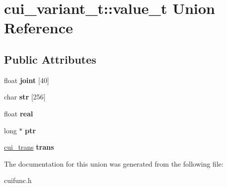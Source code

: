 \hypertarget{unioncui__variant__t_1_1value__t}{\section{cui\-\_\-variant\-\_\-t\-:\-:value\-\_\-t Union Reference}
\label{unioncui__variant__t_1_1value__t}
}
\subsection*{Public Attributes}
\begin{DoxyCompactItemize}
\item 
\hypertarget{unioncui__variant__t_1_1value__t_afac86c005325dd05c5dc98daf880e931}{float {\bfseries joint} \mbox{[}40\mbox{]}}\label{unioncui__variant__t_1_1value__t_afac86c005325dd05c5dc98daf880e931}

\item 
\hypertarget{unioncui__variant__t_1_1value__t_af57800df34d46ee9447b465b2d713198}{char {\bfseries str} \mbox{[}256\mbox{]}}\label{unioncui__variant__t_1_1value__t_af57800df34d46ee9447b465b2d713198}

\item 
\hypertarget{unioncui__variant__t_1_1value__t_a41d8758f27d67c00b0f1d4c7afac4319}{float {\bfseries real}}\label{unioncui__variant__t_1_1value__t_a41d8758f27d67c00b0f1d4c7afac4319}

\item 
\hypertarget{unioncui__variant__t_1_1value__t_a396c1c191640228e0dc570910c9067c3}{long $\ast$ {\bfseries ptr}}\label{unioncui__variant__t_1_1value__t_a396c1c191640228e0dc570910c9067c3}

\item 
\hypertarget{unioncui__variant__t_1_1value__t_a5bccac954db2b889b70de5969c62e7dd}{\hyperlink{structcui__trans}{cui\-\_\-trans} {\bfseries trans}}\label{unioncui__variant__t_1_1value__t_a5bccac954db2b889b70de5969c62e7dd}

\end{DoxyCompactItemize}


The documentation for this union was generated from the following file\-:\begin{DoxyCompactItemize}
\item 
cuifunc.\-h\end{DoxyCompactItemize}
